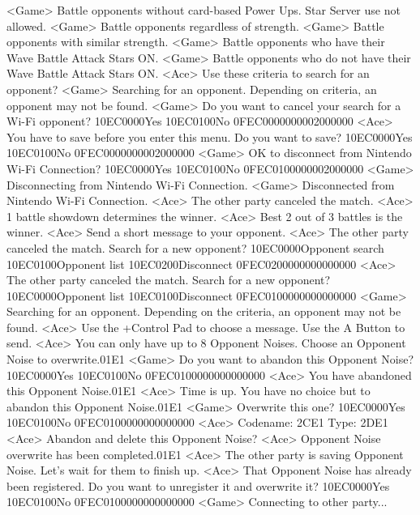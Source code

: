<Game> Battle opponents without card-based Power Ups. Star Server use not allowed.
<Game> Battle opponents regardless of strength.
<Game> Battle opponents with similar strength.
<Game> Battle opponents who have their Wave Battle Attack Stars ON.
<Game> Battle opponents who do not have their Wave Battle Attack Stars ON.
<Ace> Use these criteria to search for an opponent?
<Game> Searching for an opponent. Depending on criteria, an opponent may not be found.
<Game> Do you want to cancel your search for a Wi-Fi opponent? {10}{EC}{00}{00}Yes {10}{EC}{01}{00}No {0F}{EC}{00}{00}{00}{00}{02}{00}{00}{00}
<Ace> You have to save before you enter this menu. Do you want to save? {10}{EC}{00}{00}Yes {10}{EC}{01}{00}No {0F}{EC}{00}{00}{00}{00}{02}{00}{00}{00}
<Game> OK to disconnect from Nintendo Wi-Fi Connection? {10}{EC}{00}{00}Yes {10}{EC}{01}{00}No {0F}{EC}{01}{00}{00}{00}{02}{00}{00}{00}
<Game> Disconnecting from Nintendo Wi-Fi Connection.
<Game> Disconnected from Nintendo Wi-Fi Connection.
<Ace> The other party canceled the match.
<Ace> 1 battle showdown determines the winner.
<Ace> Best 2 out of 3 battles is the winner.
<Ace> Send a short message to your opponent.
<Ace> The other party canceled the match. 
Search for a new opponent? {10}{EC}{00}{00}Opponent search {10}{EC}{01}{00}Opponent list {10}{EC}{02}{00}Disconnect {0F}{EC}{02}{00}{00}{00}{00}{00}{00}{00}
<Ace> The other party canceled the match. 
Search for a new opponent? {10}{EC}{00}{00}Opponent list {10}{EC}{01}{00}Disconnect {0F}{EC}{01}{00}{00}{00}{00}{00}{00}{00}
<Game> Searching for an opponent. Depending on the criteria, an opponent may not be found.
<Ace> Use the +Control Pad to choose a message. Use the A Button to send.
<Ace> You can only have up to 8 Opponent Noises. Choose an Opponent Noise to overwrite.{01}{E1}
<Game> Do you want to abandon this Opponent Noise? {10}{EC}{00}{00}Yes {10}{EC}{01}{00}No {0F}{EC}{01}{00}{00}{00}{00}{00}{00}{00}
<Ace> You have abandoned this Opponent Noise.{01}{E1}
<Ace> Time is up. You have no choice but to abandon this Opponent Noise.{01}{E1}
<Game> Overwrite this one? {10}{EC}{00}{00}Yes {10}{EC}{01}{00}No {0F}{EC}{01}{00}{00}{00}{00}{00}{00}{00}
<Ace> Codename: {2C}{E1} Type: {2D}{E1}
<Ace> Abandon and delete this Opponent Noise?
<Ace> Opponent Noise overwrite has been completed.{01}{E1}
<Ace> The other party is saving Opponent Noise. Let's wait for them to finish up.
<Ace> That Opponent Noise has already been registered. 
Do you want to unregister it and overwrite it? {10}{EC}{00}{00}Yes {10}{EC}{01}{00}No {0F}{EC}{01}{00}{00}{00}{00}{00}{00}{00}
<Game> Connecting to other party...
